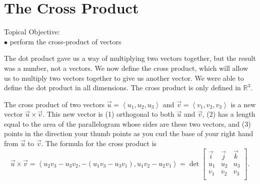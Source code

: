 \fi

\section{The Cross Product}
\large Topical Objective: \normalsize \\
\indent $\bullet$ perform the cross-product of vectors\\

\vskip0.2in

The dot product gave us a way of multiplying two vectors together, but the result was a number, not a vectors. We now define the cross product, which will allow us to multiply two vectors together to give us another vector.  We were able to define the dot product in all dimensions.  The cross product is only defined in $\mathbb{R}^3$. 

\begin{definition}
The cross product of two vectors $\vec u = \left<u_1,u_2,u_3\right>$ and $\vec v = \left<v_1,v_2,v_3\right>$ is a new vector $\vec u\times \vec v$. This new vector is (1) orthogonal to both $\vec u$ and $\vec v$, (2) has a length equal to the area of the parallelogram whose sides are these two vectors, and (3) points in the direction your thumb points as you curl the base of your right hand from $\vec u$ to $\vec v$. The formula for the cross product is $$\vec u\times \vec v = \left<u_2v_3-u_3v_2,-(u_1v_3-u_3v_1),u_1v_2-u_2v_1\right> = \det\begin{bmatrix}\vec i & \vec j&\vec k\\ u_1&u_2&u_3\\ v_1&v_2&v_3\\\end{bmatrix}.$$
\end{definition}

